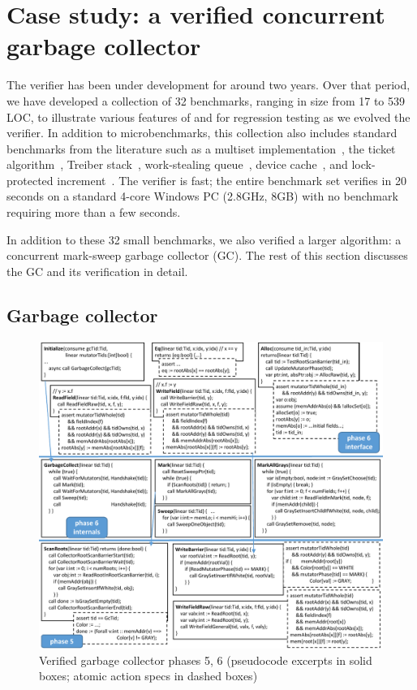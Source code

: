 \section{Case study: a verified concurrent garbage collector}
\label{sec:experience}

The \civl verifier has been under development for around two years.  
Over that period, we have developed a collection of 32 benchmarks, 
ranging in size from 17 to 539 LOC, to illustrate various features of
\civl and for regression testing as we evolved the verifier.
In addition to microbenchmarks, this collection also includes
standard benchmarks from the literature such as a multiset implementation~\cite{ElmasTQ05}, 
the ticket algorithm~\cite{FarzanKP14}, 
Treiber stack~\cite{Herlihy2008}, work-stealing queue~\cite{Blumofe1999},
device cache~\cite{ElmasQT09}, and lock-protected increment~\cite{FlanaganQ03}. 
The \civl verifier is fast; the entire benchmark set verifies in 20 seconds on a standard 4-core Windows PC (2.8GHz, 8GB)
with no benchmark requiring more than a few seconds.

In addition to these 32 small benchmarks,
we also verified a larger algorithm:
a concurrent mark-sweep garbage collector (GC).
The rest of this section discusses the GC and its verification in detail.

\subsection{Garbage collector}


\begin{figure}
\includegraphics[scale=1.0]{VerifiedGC.pdf}
\caption{Verified garbage collector phases 5, 6 (pseudocode excerpts in solid boxes; atomic action specs in dashed boxes)}
\label{fig:VerifiedGC}
\end{figure}

